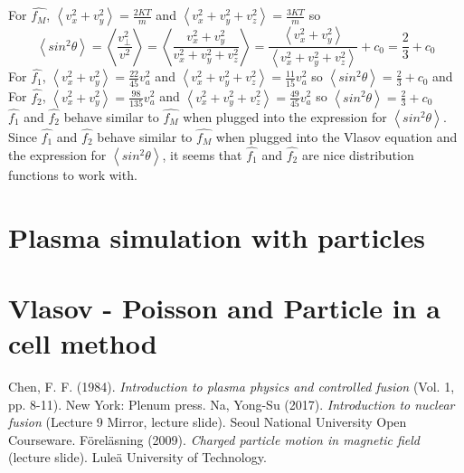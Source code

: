 \documentclass[12pt]{article}
\begin{document}
{	\noindent For $\widehat{f_{M}}$, $\displaystyle \left\langle v_{x}^{2} + v_{y}^{2}\right\rangle = \frac{\displaystyle 2 K T}{\displaystyle m}$ and $\left\langle v_{x}^{2} + v_{y}^{2} +  v_{z}^{2}\right\rangle = \frac{\displaystyle 3 K T}{\displaystyle m}$ so $$\left\langle sin^{2}\theta\right\rangle = \left\langle \frac{\displaystyle v_{\perp}^{2}}{\displaystyle v^{2}}\right\rangle = \left\langle \frac{\displaystyle v_{x}^{2} + v_{y}^{2}}{\displaystyle v_{x}^{2} + v_{y}^{2} +  v_{z}^{2}}\right\rangle = \frac{\displaystyle \left\langle v_{x}^{2} + v_{y}^{2}\right\rangle}  {\displaystyle \left\langle v_{x}^{2} + v_{y}^{2} +  v_{z}^{2}\right\rangle} + c_{0} = \frac{2}{3} + c_{0}$$
	For $\hat{f_{1}}$, $\displaystyle \left\langle v_{x}^{2} + v_{y}^{2}\right\rangle = \frac{22}{45} v_{a}^2$ and $\displaystyle \left\langle v_{x}^{2} + v_{y}^{2} +  v_{z}^{2}\right\rangle = \frac{11}{15} v_{a}^2$ so $\displaystyle \left\langle sin^{2}\theta\right\rangle = \frac{2}{3} + c_{0}$ and \vspace{0.2cm} \\
	\noindent For $\hat{f_{2}}$, $\displaystyle \left\langle v_{x}^{2} + v_{y}^{2}\right\rangle = \frac{98}{135} v_{a}^2$ and $\displaystyle \left\langle v_{x}^{2} + v_{y}^{2} +  v_{z}^{2}\right\rangle = \frac{49}{45} v_{a}^2$ so $\displaystyle \left\langle sin^{2}\theta\right\rangle = \frac{2}{3} + c_{0}$ \\
	\noindent $\hat{f_{1}}$ and $\hat{f_{2}}$ behave similar to $\widehat{f_{M}}$ when plugged into the expression for $\left\langle sin^{2}\theta\right\rangle$. \\
	
	\noindent Since $\hat{f_{1}}$ and $\hat{f_{2}}$ behave similar to $\widehat{f_{M}}$ when plugged into the Vlasov equation and the expression for $\left\langle sin^{2}\theta\right\rangle$, it seems that $\hat{f_{1}}$ and $\hat{f_{2}}$ are nice distribution functions to work with.
	
\section{Plasma simulation with particles}

\section{Vlasov - Poisson and Particle in a cell method}
	

\begin{thebibliography}{}
	Chen, F. F. (1984). \textit{Introduction to plasma physics and controlled fusion} (Vol. 1, pp. 8-11). New York: Plenum press.
	Na, Yong-Su (2017). \textit{Introduction to nuclear fusion} (Lecture 9 Mirror, lecture slide). Seoul National University Open Courseware.
	F\"{o}rel\"{a}sning (2009). \textit{Charged particle motion in magnetic field} (lecture slide). Lule\"{a} University of Technology.
	
\end{thebibliography}	
}	
\end{document}
